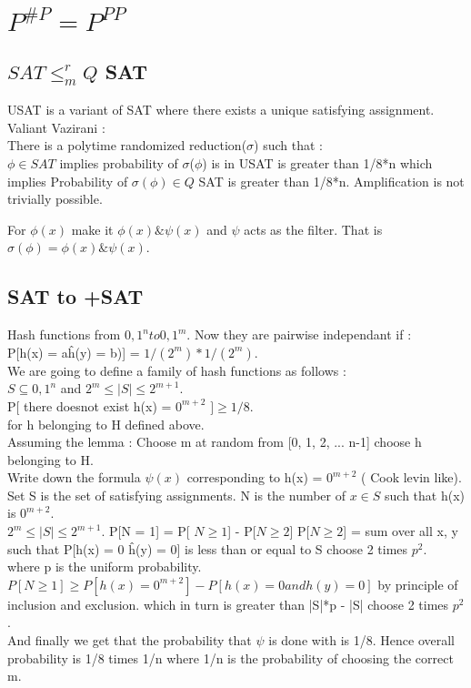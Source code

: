 \documentclass[solution,addpoints,12pt]{exam}
\begin{document}
\section{$P^{\#P} = P^{PP}$}

\subsection{$SAT \le_m^r Q$ SAT}
USAT is a variant of SAT where there exists a unique satisfying assignment.
Valiant Vazirani :\\
There is a polytime randomized reduction($\sigma$) such that :\\
$\phi \in SAT$ implies probability of $\sigma$($\phi$) is in USAT
is greater than 1/8*n which implies Probability of $\sigma(\phi) \in Q$ SAT is greater
than 1/8*n. Amplification is not trivially possible.

For $\phi(x)$ make it $\phi(x) \& \psi(x)$ and $\psi$
acts as the filter. That is $\sigma(\phi) = \phi(x) \& \psi(x)$.\\

\subsection{SAT to +SAT}
Hash functions from ${0, 1}^n to {0, 1}^m$.
Now they are pairwise independant if :\\
P[h(x) = a\^h(y) = b)] = $1/(2^m)*1/(2^m)$.\\
We are going to define a family of hash functions as follows :\\
$S \subseteq {0, 1}^n$ and $2^m \le |S| \le 2^{m + 1}$.\\
P[ there doesnot exist h(x) = $0^{m+2}$ $] \ge 1/8$.\\
for h belonging to H defined above.\\
Assuming the lemma : Choose m at random from [0, 1, 2, ... n-1]
choose h belonging to H.\\
Write down the formula $\psi(x)$ corresponding to h(x) = $0^{m+2}$ ( Cook levin
like).
Set S is the set of satisfying assignments.
N is the number of $x \in S$ such that h(x) is $0^{m + 2}$.\\
$2^m \le |S| \le 2^{m+1}$.
P[N = 1] = P[ $N \ge 1$] - P[$N \ge 2$]
P[$ N \ge 2$] = sum over all x, y such that P[h(x) = 0 \^ h(y) = 0]
is less than or equal to S choose 2 times $p^2$.\\
where p is the uniform probability.\\
$P[N \ge 1] \ge P[h(x) = 0^{m+2}] - P[h(x) = 0 and h(y) = 0]$
by principle of inclusion and exclusion.
which in turn is greater than |S|*p - |S| choose 2 times $p^2$.\\
And finally we get that the probability that $\psi$ is done with is
1/8. Hence overall probability is 1/8 times 1/n
where 1/n is the probability of choosing the correct m.
\end{document}
